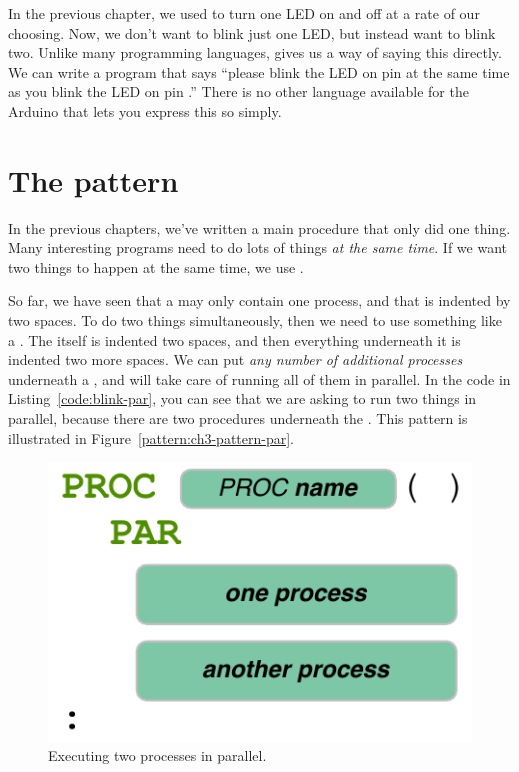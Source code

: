 In the previous chapter, we used \blink to turn one LED on and off at a rate of our choosing. Now, we don't want to blink just one LED, but instead want to blink two. Unlike many programming languages, \occam gives us a way of saying this directly. We can write a program that says ``please blink the LED on pin \pineleven at the same time as you blink the LED on pin \pintwelve.'' There is no other language available for the Arduino that lets you express this so simply.

\newpage

\CODE


\section{The \PAR pattern}

In the previous chapters, we've written a {\procname main} procedure that only did one thing. Many interesting programs need to do lots of things {\em at the same time}. If we want two things to happen at the same time, we use \PAR.

So far, we have seen that a \PROC may only contain one process, and that is indented by two spaces. To do two things simultaneously, then we need to use something like a \PAR. The \PAR itself is indented two spaces, and then everything underneath it is indented two more spaces. We can put {\em any number of additional processes} underneath a \PAR, and \occam will take care of running all of them in parallel. In the code in Listing~\vref{code:blink-par}, you can see that we are asking \plumbing to run two things in parallel, because there are two procedures underneath the \PAR. This pattern is illustrated in Figure~\vref{pattern:ch3-pattern-par}.

\begin{figure}[h]
  \begin{center}
    \includegraphics[width=0.6\linewidth]{images/ch3-pattern-par}
    \caption{Executing two processes in parallel.}
    \label{pattern:ch3-pattern-par}
  \end{center}
\end{figure}

